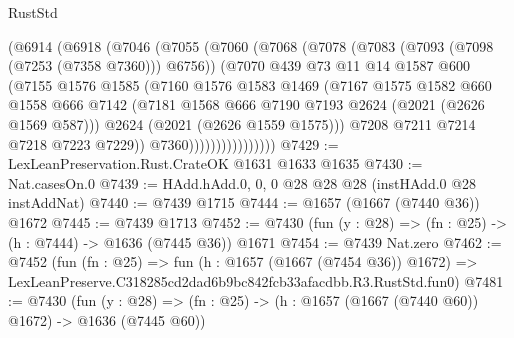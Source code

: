\begin{lexlean}{RustStd}
\begin{coremodule}
                    (@6914
                      (@6918
                        (@7046
                          (@7055
                            (@7060
                              (@7068
                                (@7078
                                  (@7083 (@7093 (@7098 (@7253 (@7358 @7360))) @6756))
                                  (@7070
                                    @439
                                    @73
                                    @11
                                    @14
                                    @1587
                                    @600
                                    (@7155
                                      @1576
                                      @1585
                                      (@7160
                                        @1576
                                        @1583
                                        @1469
                                        (@7167
                                          @1575
                                          @1582
                                          @660
                                          @1558
                                          @666
                                          @7142
                                          (@7181
                                            @1568
                                            @666
                                            @7190
                                            @7193
                                            @2624
                                            (@2021 (@2626 @1569 @587)))
                                          @2624
                                          (@2021 (@2626 @1559 @1575)))
                                        @7208
                                        @7211
                                        @7214
                                        @7218
                                        @7223
                                        @7229))
                                    @7360))))))))))))))))
@7429 := LexLeanPreservation.Rust.CrateOK @1631 @1633 @1635
@7430 := Nat.casesOn.{0}
@7439 := HAdd.hAdd.{0, 0, 0} @28 @28 @28 (instHAdd.{0} @28 instAddNat)
@7440 := @7439 @1715
@7444 := @1657 (@1667 (@7440 @36)) @1672
@7445 := @7439 @1713
@7452 := @7430 (fun (y : @28) => (fn : @25) -> (h : @7444) -> @1636 (@7445 @36)) @1671
@7454 := @7439 Nat.zero
@7462 := @7452
    (fun (fn : @25) =>
    fun (h : @1657 (@1667 (@7454 @36)) @1672) =>
    LexLeanPreserve.C318285cd2dad6b9bc842fcb33afacdbb.R3.RustStd.fun0)
@7481 := @7430
    (fun (y : @28) => (fn : @25) -> (h : @1657 (@1667 (@7440 @60)) @1672) -> @1636 (@7445 @60))

\end{coremodule}
\end{lexlean}
